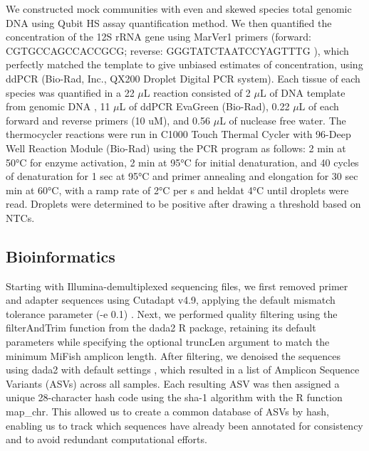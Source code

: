 \documentclass[9pt,twoside,lineno]{pnas-SI}
\begin{document}
We constructed mock communities with even and skewed species total genomic DNA using Qubit HS assay quantification method. We then quantified the concentration of the 12S rRNA gene using MarVer1 primers (forward: CGTGCCAGCCACCGCG; reverse: GGGTATCTAATCCYAGTTTG \cite{valsecchi2020}), which perfectly matched the template to give unbiased estimates of concentration, using ddPCR (Bio-Rad, Inc., QX200 Droplet Digital PCR system). Each tissue of each species was quantified in a 22 $\mu$L reaction consisted of 2 $\mu$L of DNA template from genomic DNA , 11 $\mu$L of ddPCR EvaGreen (Bio-Rad), 0.22 $\mu$L of each forward and reverse primers (10 uM), and 0.56 $\mu$L of nuclease free water. The thermocycler reactions were run in C1000 Touch Thermal Cycler with 96-Deep Well Reaction Module (Bio-Rad) using the PCR program as follows: 2 min at 50°C for enzyme activation, 2 min at 95°C for initial denaturation, and 40 cycles of denaturation for 1 sec at 95°C and primer annealing and elongation for 30 sec min at 60°C, with a ramp rate of 2°C per s and heldat 4°C until droplets were read. Droplets were determined to be positive after drawing a threshold based on NTCs.

\subsection*{Bioinformatics}
Starting with Illumina-demultiplexed sequencing files, we first removed primer and adapter sequences using Cutadapt v4.9, applying the default mismatch tolerance parameter (-e 0.1) \cite{martin2011}. Next, we performed quality filtering using the filterAndTrim function from the dada2 R package, retaining its default parameters while specifying the optional truncLen argument to match the minimum MiFish amplicon length. After filtering, we denoised the sequences using dada2 with default settings \cite{callahan2016}, which resulted in a list of Amplicon Sequence Variants (ASVs) across all samples. Each resulting ASV was then assigned a unique 28-character hash code using the sha-1 algorithm with the R function map\_chr. This allowed us to create a common database of ASVs by hash, enabling us to track which sequences have already been annotated for consistency and to avoid redundant computational efforts.
\end{document}
